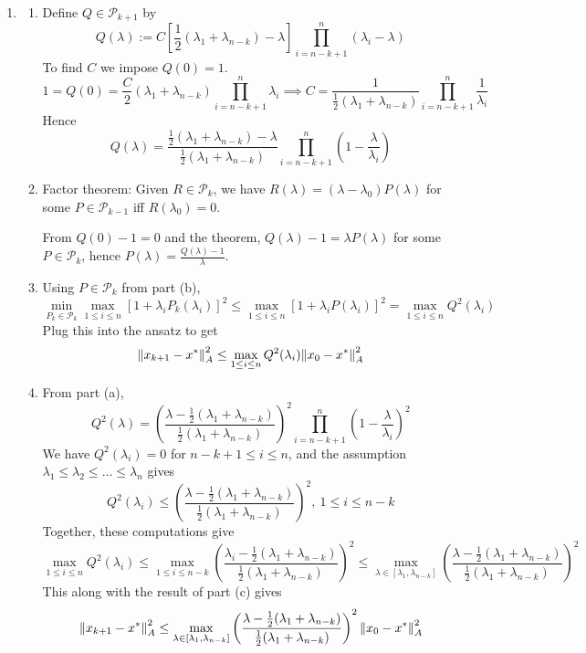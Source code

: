 \documentclass{article}
\newcommand{\br}[1]{\left(#1\right)}
\newcommand{\sbr}[1]{\left[#1\right]}
\newcommand{\imp}{\implies}
\renewcommand{\l}{\lambda}
\begin{document}
\begin{enumerate}
\begin{itemize}
		
	\end{itemize}
	
	
	
	\pagebreak
	
	
	
	\item
	
	\begin{enumerate}
		
		
		
		\item Define $Q\in\mathcal P_{k+1}$ by
		\[Q(\l) := C\sbr{\frac12(\l_1+\l_{n-k})-\l}\prod_{i=n-k+1}^{n}(\l_{i}-\l)\]
		To find $C$ we impose $Q(0)=1$.
		\[1 = Q(0) = \frac{C}{2}(\l_1+\l_{n-k})\prod_{i=n-k+1}^{n}\l_{i}
		\imp C = \frac{1}{\frac12(\l_1+\l_{n-k})}\prod_{i=n-k+1}^{n}\frac{1}{\l_{i}}\]
		Hence
		\[Q(\l) = \frac{\frac12(\l_1+\l_{n-k})-\l}{\frac12(\l_1+\l_{n-k})}\prod_{i=n-k+1}^n \br{1-\frac{\l}{\l_i}}\]
		
		
		
		\item Factor theorem: Given $R\in\mathcal P_k$, we have $R(\l)=(\l-\l_0)P(\l)$ for some $P\in\mathcal P_{k-1}$ iff $R(\l_0)=0$.
		
		From $Q(0)-1=0$ and the theorem, $Q(\l)-1=\l P(\l)$ for some $P\in\mathcal P_k$, hence $P(\l)=\frac{Q(\l)-1}{\l}$.
		
		
		
		\item Using $P\in\mathcal P_k$ from part (b),
		\[\min_{P_k\in\mathcal P_k}\max_{1\le i\le n}[1+\l_iP_k(\l_i)]^2
		\le \max_{1\le i\le n}[1+\l_iP(\l_i)]^2
		= \max_{1\le i\le n}Q^2(\l_i)\]
		Plug this into the ansatz to get
		\[\norm{x_{k+1}-x^*}_A^2 \le \max_{1\le i\le n}Q^2(\l_i)\norm{x_0-x^*}_A^2\]
		
		
		
		\item From part (a),
		\[Q^2(\l) = \br{\frac{\l-\frac12(\l_1+\l_{n-k})}{\frac12(\l_1+\l_{n-k})}}^2\prod_{i=n-k+1}^n \br{1-\frac{\l}{\l_i}}^2\]
		We have $Q^2(\l_i) = 0$ for $n-k+1\le i\le n$, and the assumption $\l_1\le\l_2\le\dots\le\l_n$ gives
		\[Q^2(\l_i) \le \br{\frac{\l-\frac12(\l_1+\l_{n-k})}{\frac12(\l_1+\l_{n-k})}}^2,~ 1\le i\le n-k\]
		Together, these computations give
		\[\max_{1\le i\le n} Q^2(\l_i) \le \max_{1\le i\le n-k} \br{\frac{\l_i-\frac12(\l_1+\l_{n-k})}{\frac12(\l_1+\l_{n-k})}}^2
		\le \max_{\l\in[\l_1,\l_{n-k}]}\br{\frac{\l-\frac12(\l_1+\l_{n-k})}{\frac12(\l_1+\l_{n-k})}}^2\]
		This along with the result of part (c) gives
		\[\norm{x_{k+1}-x^*}_A^2 \le \max_{\l\in[\l_1,\l_{n-k}]}\br{\frac{\l-\frac12(\l_1+\l_{n-k})}{\frac12(\l_1+\l_{n-k})}}^2 \norm{x_0-x^*}_A^2\]
		

\end{enumerate}
\end{enumerate}
\end{document}
